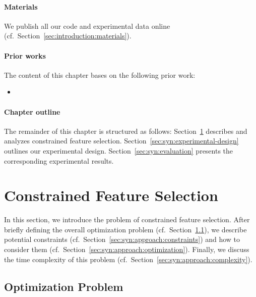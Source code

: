 \paragraph{Materials}

We publish all our code and experimental data online (cf.~Section~\ref{sec:introduction:materials}).

\paragraph{Prior works}

The content of this chapter bases on the following prior work:
%
\begin{itemize}
	\item {}
\end{itemize}

\paragraph{Chapter outline}

The remainder of this chapter is structured as follows:
Section~\ref{sec:syn:approach} describes and analyzes constrained feature selection.
Section~\ref{sec:syn:experimental-design} outlines our experimental design.
Section~\ref{sec:syn:evaluation} presents the corresponding experimental results.

\section{Constrained Feature Selection}
\label{sec:syn:approach}

In this section, we introduce the problem of constrained feature selection.
After briefly defining the overall optimization problem (cf.~Section~\ref{sec:syn:approach:problem}), we describe potential constraints (cf.~Section~\ref{sec:syn:approach:constraints}) and how to consider them (cf.~Section~\ref{sec:syn:approach:optimization}).
Finally, we discuss the time complexity of this problem (cf.~Section~\ref{sec:syn:approach:complexity}).

\subsection{Optimization Problem}
\label{sec:syn:approach:problem}


